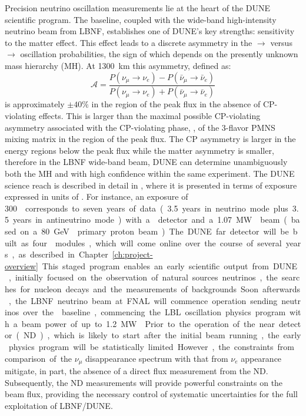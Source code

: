 Precision neutrino oscillation measurements lie at the heart of the DUNE scientific program.
The  baseline, coupled with the wide-band
high-intensity neutrino beam from LBNF, establishes one of DUNE's key
strengths: sensitivity to the matter effect. This effect leads to a
discrete asymmetry in the \numu $\to$ \nue versus \anumu $\to$ \anue
oscillation probabilities, the sign of which depends on the presently
unknown mass hierarchy (MH).  At \SI{1300}{\km} this asymmetry, defined as:
\begin{equation}
\mathcal{A} = \frac{ P(\nu_\mu \rightarrow \nu_e)-P(\bar{\nu}_\mu \rightarrow \bar{\nu}_e)}{P(\nu_\mu \rightarrow \nu_e)+P(\bar{\nu}_\mu \rightarrow \bar{\nu}_e)}
\end{equation}
is approximately $\pm 40\%$ in the region of the peak flux in the
absence of CP-violating effects. This is larger than the maximal
possible CP-violating asymmetry associated with the CP-violating
phase, \deltacp, of the 3-flavor PMNS mixing matrix in the region of
the peak flux. The CP asymmetry is larger in the energy regions below the peak
flux while the matter asymmetry is smaller, therefore in the LBNF
wide-band beam, DUNE can determine unambiguously both the MH and
\deltacp with high confidence within the same experiment.
The DUNE science reach is described in detail in \volphys, where it is presented 
in terms of  exposure expressed in units of \ktMWyr{}. For instance, an
exposure of \SI{300}\ktMWyr{} corresponds to seven years of data
(\num{3.5} years in neutrino mode plus \num{3.5} years in antineutrino
mode) with a  detector and a \SI{1.07}\MW{} beam (based on a \SI{80}\GeV{} primary proton beam).

The DUNE far detector will be built as four  modules, which will
come online over the course of several years, as described in Chapter~\ref{ch:project-overview}. 
This staged program enables an early scientific output from DUNE, 
initially focused on the observation of natural
sources neutrinos, the searches for nucleon decays and the
measurements of backgrounds. Soon afterwards, the LBNF neutrino
beam at FNAL will commence operation sending neutrinos over the 
baseline, commencing the LBL oscillation physics program with a beam power of up to \SI{1.2}\MW{}. 
Prior to the operation of the near detector (ND), which
is likely to start after the initial beam running, the early physics program
will be statistically limited. However, the constraints from comparison of the $\nu_\mu$
disappearance spectrum with that from $\nu_e$ appearance mitigate, in part,
the absence of a direct flux measurement from the ND. Subsequently, the ND
measurements will provide powerful constraints on the beam flux, providing the
necessary control of systematic uncertainties for the full exploitation of LBNF/DUNE. 

